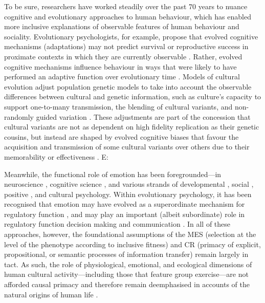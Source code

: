 \begin{CJK}{UTF8}{gbsn}
To be sure, researchers have worked steadily over the past 70 years to nuance cognitive and evolutionary approaches to human behaviour, which has enabled more inclusive explanations of observable features of human behaviour and sociality.  Evolutionary psychologists, for example, propose that evolved cognitive mechanisms (adaptations) may not predict survival or reproductive success in proximate contexts in which they are currently observable \citep[as per the assumption utilised in human behavioural ecology known as the ``phenotypic gambit;'' see][]{Grafen1984}.  Rather, evolved cognitive mechanisms influence behaviour in ways that were likely to have performed an adaptive function over evolutionary time \citep[a theoretical formulation known as the ``environment of evolutionary adaptiveness'' (EEA)][]{Cosmides1992a,Buss1988}.  Models of cultural evolution adjust population genetic models to take into account the observable differences between cultural and genetic information, such as culture's capacity to support one-to-many transmission, the blending of cultural variants, and non-randomly guided variation \citep{Cavalli-Sforza1981,Boyd1988}.  These adjustments are part of the concession that cultural variants are not as dependent on high fidelity replication as their genetic cousins, but instead are shaped by evolved cognitive biases that favour the acquisition and transmission of some cultural variants over others due to their memorability or effectiveness \citep[i.e., context sensitivity][]{Henrich2007}. E:

Meanwhile, the functional role of emotion has been foregrounded---in neuroscience \citep{Damasio1994}, cognitive science \citep{Lazarus1982}, and various strands of developmental \citep{Campos1989}, social \citep{Parrott2001}, positive \citep{Frederickson2001}, and cultural \citep{Nisbett2003} psychology.
Within evolutionary psychology, it has been recognised that emotion may have evolved as a superordinate mechanism for regulatory function \citep{Cosmides2000}, and may play an important (albeit subordinate) role in regulatory function  decision making \citep{Dalgleish2004} and communication \citep{Rime2009}.  In all of these approaches, however, the foundational assumptions of the MES (selection at the level of the phenotype according to inclusive fitness) and CR (primacy of explicit, propositional, or semantic processes of information transfer) remain largely in tact.  As such, the role of physiological, emotional, and ecological dimensions of human cultural activity---including those that feature group exercise---are not afforded causal primacy and therefore remain deemphasised in accounts of the natural origins of human life \citep{Badcock2012}.


\end{CJK}
